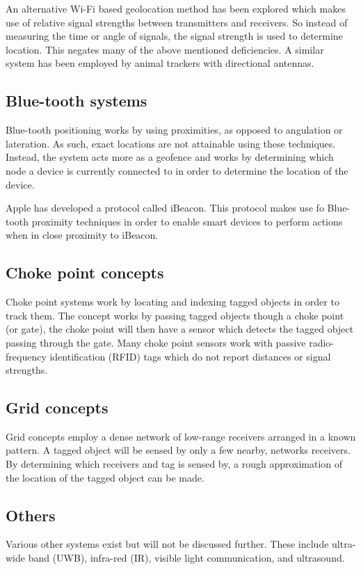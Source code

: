 \documentclass[11pt,a4paper]{report}
\begin{document}
		An alternative Wi-Fi based geolocation method has been explored which makes use of relative signal strengths between transmitters and receivers. So instead of measuring the time or angle of signals, the signal strength is used to determine location. This negates many of the above mentioned deficiencies. A similar system has been employed by animal trackers with directional antennas.
		\cite{yongguang_chen_signal_2002}
	
	\subsection{Blue-tooth systems}
		Blue-tooth positioning works by using proximities, as opposed to angulation or lateration. As such, exact locations are not attainable using these techniques. Instead, the system acts more as a geofence and works by determining which node a device is currently connected to in order to determine the location of the device.
	
		Apple has developed a protocol called iBeacon. This protocol makes use fo Blue-tooth proximity techniques in order to enable smart devices to perform actions when in close proximity to iBeacon.
		\cite{_everything_????}
	
	\subsection{Choke point concepts}
		Choke point systems work by locating and indexing tagged objects in order to track them. The concept works by passing tagged objects though a choke point (or gate), the choke point will then have a sensor which detects the tagged object passing through the gate. Many choke point sensors work with passive radio-frequency identification (RFID) tags which do not report distances or signal strengths.
		\cite{reza_investigation_2008}
	
	\subsection{Grid concepts}
		Grid concepts employ a dense network of low-range receivers arranged in a known pattern. A tagged object will be sensed by only a few nearby, networks receivers. By determining which receivers and tag is sensed by, a rough approximation of the location of the tagged object can be made.
	
	\subsection{Others}
		Various other systems exist but will not be discussed further. These include ultra-wide band (UWB), infra-red (IR), visible light communication, and ultrasound.
	
\end{document}
